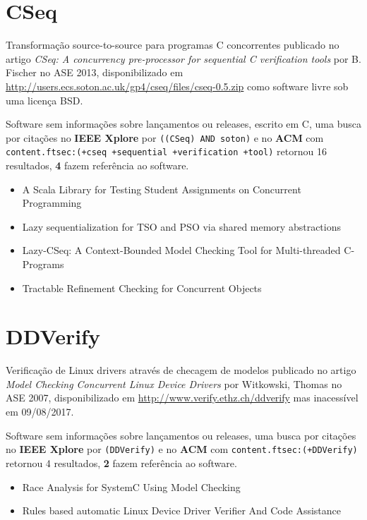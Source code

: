 \section{CSeq}

Transformação source-to-source para programas C concorrentes
publicado no artigo {\it CSeq: A concurrency pre-processor for sequential C verification tools}
por B. Fischer
no ASE 2013,
disponibilizado em \url{http://users.ecs.soton.ac.uk/gp4/cseq/files/cseq-0.5.zip}
como software livre
sob uma licença BSD.

Software sem informações sobre lançamentos ou releases,
escrito em C,
uma busca por citações no {\bf IEEE Xplore} por
\texttt{((CSeq) AND soton)}
e no {\bf ACM} com
\texttt{content.ftsec:(+cseq +sequential +verification +tool)}
retornou
16 resultados,
{\bf 4} fazem referência ao software.

\begin{itemize}
\item A Scala Library for Testing Student Assignments on Concurrent Programming
\item Lazy sequentialization for TSO and PSO via shared memory abstractions
\item Lazy-CSeq: A Context-Bounded Model Checking Tool for Multi-threaded C-Programs
\item Tractable Refinement Checking for Concurrent Objects
\end{itemize}


\section{DDVerify}

Verificação de Linux drivers através de checagem de modelos
publicado no artigo {\it Model Checking Concurrent Linux Device Drivers}
por Witkowski, Thomas
no ASE 2007,
disponibilizado em \url{http://www.verify.ethz.ch/ddverify}
mas inacessível em 09/08/2017.

Software sem informações sobre lançamentos ou releases,
uma busca por citações no {\bf IEEE Xplore} por
\texttt{(DDVerify)}
e no {\bf ACM} com
\texttt{content.ftsec:(+DDVerify)}
retornou
4 resultados,
{\bf 2} fazem referência ao software.

\begin{itemize}
\item Race Analysis for SystemC Using Model Checking
\item Rules based automatic Linux Device Driver Verifier And Code Assistance
\end{itemize}


